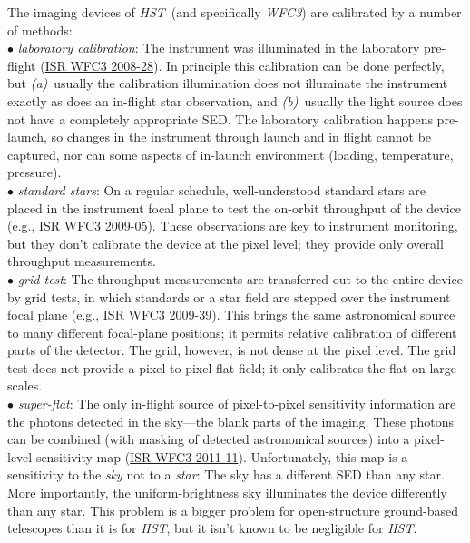 \documentclass[12pt]{article}
\newcommand{\project}[1]{\textsl{#1}}
\newcommand{\HST}{\project{HST}}
\newcommand{\WFC}{\project{WFC3}}
\begin{document}
The imaging devices of \HST\ (and specifically \WFC) are calibrated by a number of
methods:
\\ $\bullet$ \project{laboratory calibration}: The instrument was illuminated
  in the laboratory pre-flight (\href{http://bit.ly/Xn8OOH}{ISR WFC3
    2008-28}).  In principle this calibration can be
  done perfectly, but \textsl{(a)}~usually the calibration
  illumination does not illuminate the instrument exactly as does an
  in-flight star observation, and \textsl{(b)}~usually the light
  source does not have a completely appropriate SED.  The laboratory
  calibration happens pre-launch, so changes in the instrument through
  launch and in flight cannot be captured, nor can some aspects of in-launch
  environment (loading, temperature, pressure).
\\ $\bullet$ \project{standard stars}: On a regular schedule, well-understood
  standard stars are placed in the instrument focal plane to test the
  on-orbit throughput of the device (e.g.,
  \href{http://bit.ly/Y7wx5v}{ISR WFC3 2009-05}).  These
  observations are key to instrument monitoring, but they don't
  calibrate the device at the pixel level; they provide only overall
  throughput measurements.
\\ $\bullet$ \project{grid test}: The throughput measurements are transferred
  out to the entire device by grid tests, in which standards or a star
  field are stepped over the instrument focal plane (e.g., \href{http://bit.ly/XFdEYW}{ISR WFC3
  2009-39}).  This brings the same astronomical source to many
  different focal-plane positions; it permits relative calibration of
  different parts of the detector. The grid, however, is not dense at
  the pixel level.  The grid test does not provide a pixel-to-pixel
  flat field; it only calibrates the flat on large scales.
\\ $\bullet$ \project{super-flat}: The only in-flight source of
  pixel-to-pixel sensitivity information are the photons detected in
  the sky---the blank parts of the imaging.  These photons can be
  combined (with masking of detected astronomical sources) into a
  pixel-level sensitivity map (\href{http://bit.ly/YJJB2m}{ISR
    WFC3-2011-11}).  Unfortunately, this
  map is a sensitivity to the \emph{sky} not to a \emph{star}: The sky
  has a different SED than any star.  More importantly, the
  uniform-brightness sky illuminates the device differently than any
  star.  This problem is a bigger problem for open-structure
  ground-based telescopes than it is for \HST, but it isn't known to
  be negligible for \HST.  
\end{document}
